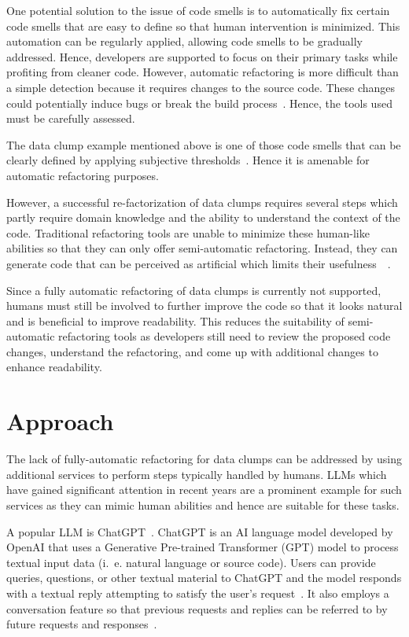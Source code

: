One potential solution to the issue of code smells is to automatically fix certain code smells that are easy to define so that human intervention is minimized. This automation can be regularly applied, allowing code smells to be gradually addressed. Hence, developers are supported  to focus on their primary tasks while profiting from cleaner code. 
However,  automatic refactoring  is more difficult than a simple detection because it requires changes to the source code. These changes could potentially induce bugs or break the build process~\cite{9796303}. Hence, the tools used must be carefully assessed. 

The data clump example mentioned above is one of those code smells that can be clearly defined by applying subjective thresholds~\cite{zhangImprovingPrecisionFowler2008}. Hence it is amenable for automatic refactoring purposes. 


However, a successful re-factorization of data clumps requires several steps which partly require domain knowledge and the ability to understand the context of the code. Traditional refactoring tools are unable to minimize these human-like abilities so that they can only offer semi-automatic refactoring.   Instead, they can generate code that can be  perceived as artificial which limits their usefulness~\cite{pomian2024furtherllmsidestatic}~\cite{4145023}. 

Since a fully automatic refactoring of data clumps is currently not supported, humans must still be involved to further improve the code so that it looks natural and is beneficial to improve readability. This reduces the suitability of semi-automatic refactoring tools as developers still need to review the proposed code changes, understand the refactoring, and come up with additional changes to enhance readability. 



\section{Approach}

The lack of fully-automatic refactoring for data clumps can be addressed by using additional 
  services to perform steps typically handled by humans.  \acp{LLM} which have gained significant attention in recent years are a prominent example for such services as they can mimic human abilities and hence are suitable for these tasks.
  
  A popular \ac{LLM} is ChatGPT~\cite{ChatGPT_url}. ChatGPT is an AI language model developed by OpenAI that uses a Generative Pre-trained Transformer (GPT) model to process textual input data (i.~e. natural language or source code). Users can provide queries, questions, or other textual material to ChatGPT and the model responds with a textual reply attempting to satisfy the user's request~\cite{yetistirenEvaluatingCodeQuality2023}. It also employs a conversation feature so that previous requests and replies can be referred to by future requests and responses~\cite{10189263}.

